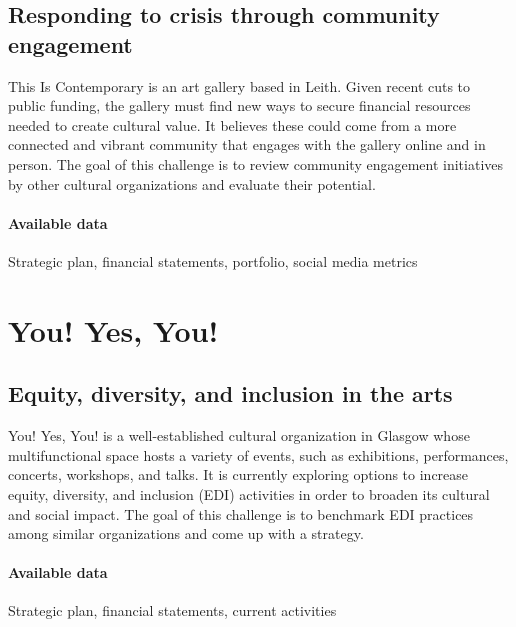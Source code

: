 \documentclass[11pt,a4paper]{article}
\begin{document}
\subsection*{Responding to crisis through community engagement}

This Is Contemporary is an art gallery based in Leith. Given recent cuts to public funding, the gallery must find new ways to secure financial resources needed to create cultural value. It believes these could come from a more connected and vibrant community that engages with the gallery online and in person. The goal of this challenge is to review community engagement initiatives by other cultural organizations and evaluate their potential.
\paragraph{Available data} Strategic plan, financial statements, portfolio, social media metrics

\vfill

\section*{You! Yes, You! \hrulefill}
\subsection*{Equity, diversity, and inclusion in the arts}

You! Yes, You! is a well-established cultural organization in Glasgow whose multifunctional space hosts a variety of events, such as exhibitions, performances, concerts, workshops, and talks. It is currently exploring options to increase equity, diversity, and inclusion (EDI) activities in order to broaden its cultural and social impact. The goal of this challenge is to benchmark EDI practices among similar organizations and come up with a strategy.
\paragraph{Available data} Strategic plan, financial statements, current activities
\end{document}
